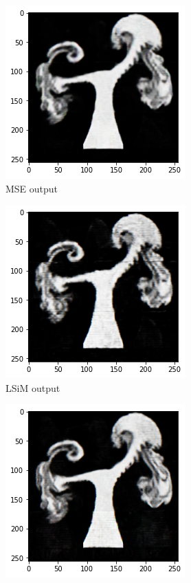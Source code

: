 \documentclass[a4paper,12pt,twoside]{report}
\begin{document}
\begin{figure}
	\centering
	\begin{subfigure}{0.32\textwidth}
		\centering
		\includegraphics[scale=0.5]{superresolution/checkerboard_mse.png}
		\caption{MSE output}
	\end{subfigure}
	\begin{subfigure}{0.32\textwidth}
		\centering
		\includegraphics[scale=0.5]{superresolution/checkerboard_lsim.png}
		\caption{LSiM output}
	\end{subfigure}
	\begin{subfigure}{0.32\textwidth}
		\centering
		\includegraphics[scale=0.5]{superresolution/checkerboard_vgg.png}

\end{subfigure}
\end{figure}
\end{document}
